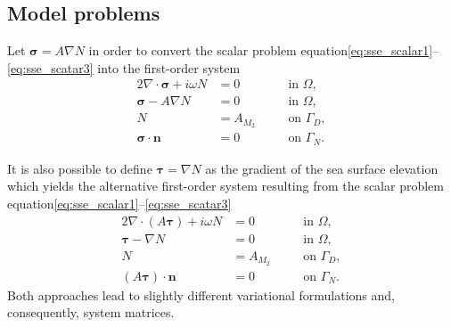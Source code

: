 \documentclass[11pt,a4paper]{article}
\begin{document}
\subsection{Model problems}
Let $\boldsymbol{\sigma}=A\nabla N$ in order to convert the scalar problem equation\eqref{eq:sse_scalar1}--\eqref{eq:sse_scatar3} into the first-order system
\begin{alignat}{2}
\nabla\cdot\boldsymbol{\sigma}+i\omega N&=0  \quad && \text{in } \Omega,
\label{eq:sse_system1}\\
\boldsymbol{\sigma}-A\nabla N&=0 \quad && \text{in } \Omega,
\label{eq:sse_system2}\\
N&=A_{M_2} \quad && \text{on } \Gamma_D,
\label{eq:sse_system3}\\
\boldsymbol{\sigma}\cdot\mathbf{n}&=0 \quad && \text{on } \Gamma_N.
\label{eq:sse_system4}
\end{alignat}

It is also possible to define $\boldsymbol{\tau}=\nabla N$ as the gradient of the sea surface elevation which yields the alternative first-order system resulting from the scalar problem equation\eqref{eq:sse_scalar1}--\eqref{eq:sse_scatar3}
\begin{alignat}{2}
\nabla\cdot(A\boldsymbol{\tau})+i\omega N&=0  \quad && \text{in } \Omega,
\label{eq:sse_system5}\\
\boldsymbol{\tau}-\nabla N&=0 \quad && \text{in } \Omega,
\label{eq:sse_system6}\\
N&=A_{M_2} \quad && \text{on } \Gamma_D,
\label{eq:sse_system7}\\
(A\boldsymbol{\tau})\cdot\mathbf{n}&=0 \quad && \text{on } \Gamma_N.
\label{eq:sse_system8}
\end{alignat}
Both approaches lead to slightly different variational formulations and, consequently, system matrices.
\end{document}
